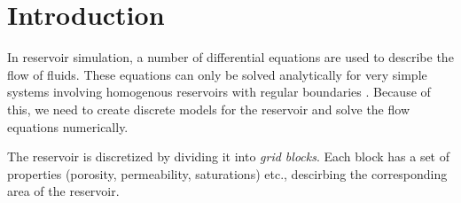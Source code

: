
\section{Introduction} %
\label{sec:introduction}
In reservoir simulation, a number of differential equations are used to describe the flow of fluids. These equations can only be solved analytically for very simple systems involving homogenous reservoirs with regular boundaries \cite{Peaceman1977Fundamentals}. Because of this, we need to create discrete models for the reservoir and solve the flow equations numerically.

The reservoir is discretized by dividing it into \emph{grid blocks}. Each block has a set of properties (porosity, permeability, saturations) etc., descirbing the corresponding area of the reservoir.

